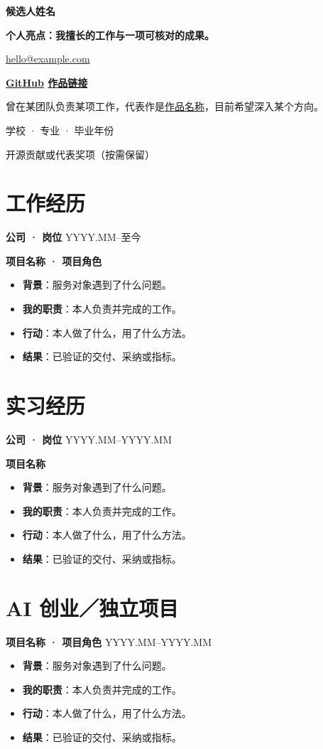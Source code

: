 \documentclass[11pt,a4paper,scheme=plain,fontset=fandol]{ctexart}
\begin{document}
{\LARGE\bfseries 候选人姓名}\par
\textbf{个人亮点：我擅长的工作与一项可核对的成果。}\par
\href{mailto:hello@example.com}{hello@example.com}
\par
\textbf{\href{https://github.com/username}{GitHub}
\enspace\textbar\enspace \href{https://example.com/portfolio}{作品链接}}\par
曾在某团队负责某项工作，代表作是\href{https://example.com/work}{作品名称}，目前希望深入某个方向。\par
学校 · 专业 · 毕业年份\par
开源贡献或代表奖项（按需保留）

\section*{工作经历}
\textbf{公司 · 岗位} \hfill YYYY.MM--至今\par
\textbf{项目名称 · 项目角色}
\begin{itemize}
  \item \textbf{背景}：服务对象遇到了什么问题。
  \item \textbf{我的职责}：本人负责并完成的工作。
  \item \textbf{行动}：本人做了什么，用了什么方法。
  \item \textbf{结果}：已验证的交付、采纳或指标。
\end{itemize}

\section*{实习经历}
\textbf{公司 · 岗位} \hfill YYYY.MM--YYYY.MM\par
\textbf{项目名称}
\begin{itemize}
  \item \textbf{背景}：服务对象遇到了什么问题。
  \item \textbf{我的职责}：本人负责并完成的工作。
  \item \textbf{行动}：本人做了什么，用了什么方法。
  \item \textbf{结果}：已验证的交付、采纳或指标。
\end{itemize}

\section*{AI 创业／独立项目}
\textbf{项目名称 · 项目角色} \hfill YYYY.MM--YYYY.MM
\begin{itemize}
  \item \textbf{背景}：服务对象遇到了什么问题。
  \item \textbf{我的职责}：本人负责并完成的工作。
  \item \textbf{行动}：本人做了什么，用了什么方法。
  \item \textbf{结果}：已验证的交付、采纳或指标。
\end{itemize}
\end{document}
